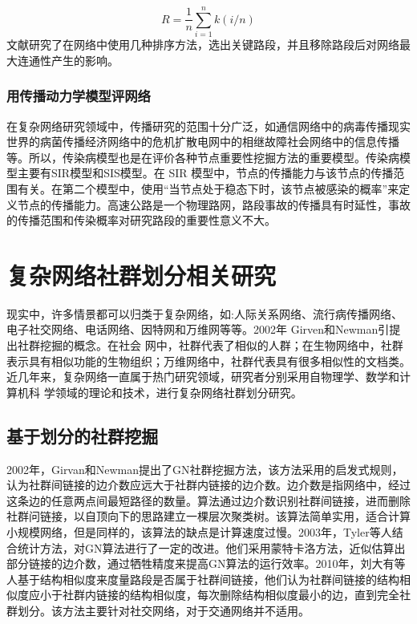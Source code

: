 				$$R=\frac{1}{n} \sum\limits_{i=1}^{n} {k(i/n)} $$
		文献\parencite{Iyer2013Attack}研究了在网络中使用几种排序方法，选出关键路段，并且移除路段后对网络最大连通性产生的影响。
	\subsubsection{用传播动力学模型评网络}
	在复杂网络研究领域中，传播研究的范围十分广泛\parencite{zt2005fz}，如通信网络中的病毒传播\parencite{L2011Small}现实世界的病菌传播经济网络中的危机扩散电网中的相继故障\parencite{Peng2013Vaccination}社会网络中的信息传播\parencite{BrummittPNAS}等。所以，传染病模型也是在评价各种节点重要性挖掘方法的重要模型。传染病模型主要有SIR模型\parencite{Bonacich1972Factoring}和SIS模型\parencite{Kitsak2010Identification}。在 SIR 模型中，节点的传播能力与该节点的传播范围有关。在第二个模型中，使用“当节点处于稳态下时，该节点被感染的概率”来定义节点的传播能力。高速公路是一个物理路网，路段事故的传播具有时延性，事故的传播范围和传染概率对研究路段的重要性意义不大。

\section{复杂网络社群划分相关研究}

	现实中，许多情景都可以归类于复杂网络，如:人际关系网络、流行病传播网络、电子社交网络、电话网络、因特网和万维网等等。2002年 Girven和Newman引提出社群挖掘的概念。在社会 网中，社群代表了相似的人群；在生物网络中，社群表示具有相似功能的生物组织；万维网络中，社群代表具有很多相似性的文档类。近几年来，复杂网络一直属于热门研究领域，研究者分别采用自物理学、数学和计算机科
学领域的理论和技术，进行复杂网络社群划分研究。
	\subsection{基于划分的社群挖掘}
		2002年，Girvan和Newman提出了GN社群挖掘方法\parencite{Girvan2001Community}，该方法采用的启发式规则，认为社群间链接的边介数应远大于社群内链接的边介数。边介数是指网络中，经过这条边的任意两点间最短路径的数量。算法通过边介数识别社群间链接，进而删除社群问链接，以自顶向下的思路建立一棵层次聚类树。该算法简单实用，适合计算小规模网络，但是同样的，该算法的缺点是计算速度过慢。2003年，Tyler等人结合统计方法，对GN算法进行了一定的改进\parencite{Tyler2003Email}。他们采用蒙特卡洛方法，近似估算出部分链接的边介数，通过牺牲精度来提高GN算法的运行效率。2010年，刘大有等人基于结构相似度来度量路段是否属于社群间链接\parencite{Di2010k}，他们认为社群间链接的结构相似度应小于社群内链接的结构相似度，每次删除结构相似度最小的边，直到完全社群划分。该方法主要针对社交网络，对于交通网络并不适用。
